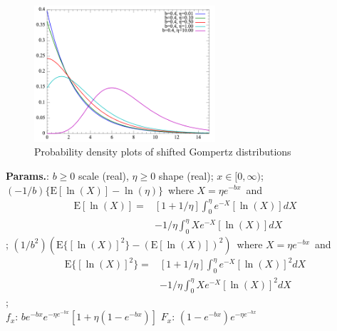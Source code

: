     \begin{figure}[H]
        \centering
        \includegraphics[width=0.6\textwidth]{images/Shiftedgompertz distribution PDF.png}
        \caption{Probability density plots of shifted Gompertz distributions}
    \end{figure}




    {\color{darkblue} \textbf{Params.}:} {$b \geq 0$ scale (real),  $\eta\geq 0$ shape (real)}; {$x \in [0, \infty)\!$}; {$(-1/b)\{\mathrm{E}[\ln(X)] - \ln(\eta)\}\,$ where $X = \eta e^{-bx}\,$ and \begin{align}\mathrm{E}[\ln(X)] =& [1 {+} 1 / \eta]\!\!\int_0^\eta \!\!\!\! e^{-X}[\ln(X)]dX\\ &- 1/\eta\!\! \int_0^\eta \!\!\!\! X e^{-X}[\ln(X)] dX \end{align}}; {$(1/b^2)(\mathrm{E}\{[\ln(X)]^2\} - (\mathrm{E}[\ln(X)])^2)\,$ where $X = \eta e^{-bx}\,$ and \begin{align}\mathrm{E}\{[\ln(X)]^2\} =& [1 {+} 1 / \eta]\!\!\int_0^\eta \!\!\!\! e^{-X}[\ln(X)]^2 dX\\ &- 1/\eta \!\!\int_0^\eta \!\!\!\! X e^{-X}[\ln(X)]^2 dX \end{align}};\hspace{0.5cm}\\{\color{darkblue} \textbf{$f_x$}:} {$b e^{-bx} e^{-\eta e^{-bx}}\left[1 + \eta\left(1 - e^{-bx}\right)\right]$}{\color{darkblue} \textbf{$F_x$}:} {$\left(1 - e^{-bx}\right)e^{-\eta e^{-bx}}$}



